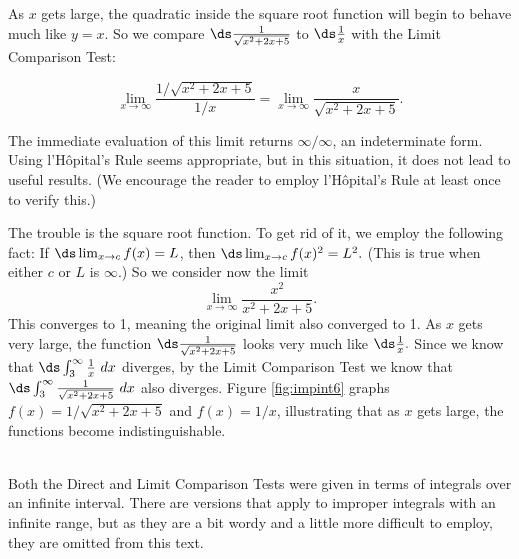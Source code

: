 {As $x$ gets large, the quadratic inside the square root function will begin to behave much like $y=x$. So we compare $\ds\frac{1}{\sqrt{x^2+2x+5}}$ to $\ds\frac1x$ with the Limit Comparison Test:

$$
\lim_{x\to\infty} \frac{1/\sqrt{x^2+2x+5}}{1/x} = \lim_{x\to\infty}\frac{x}{\sqrt{x^2+2x+5}}.$$

The immediate evaluation of this limit returns $\infty/\infty$, an indeterminate form. Using l'H\^opital's Rule seems appropriate, but in this situation, it does not lead to useful results. (We encourage the reader to employ l'H\^opital's Rule at least once to verify this.)

The trouble is the square root function. To get rid of it, we employ the following fact: If $\ds \lim_{x\to c} f(x) = L$, then $\ds\lim_{x\to c} f(x)^2 = L^2.$ (This is true when either $c$ or $L$ is $\infty$.) So we consider now the limit
$$\lim_{x\to\infty} \frac{x^2}{x^2+2x+5}.$$ This converges to 1, meaning the original limit also converged to 1. As $x$ gets very large, the function $\ds\frac{1}{\sqrt{x^2+2x+5}}$ looks very much like $\ds\frac1x.$ Since we know that $\ds\int_3^{\infty} \frac1x\ dx$ diverges, by the Limit Comparison Test we know that $\ds\int_3^\infty\frac{1}{\sqrt{x^2+2x+5}}\ dx$ also diverges. Figure \ref{fig:impint6} graphs $f(x)=1/\sqrt{x^2+2x+5}$ and $f(x)=1/x$, illustrating that as $x$ gets large, the functions become indistinguishable.
}\\

\enlargethispage{3\baselineskip}
Both the Direct and Limit Comparison Tests were given in terms of integrals over an infinite interval. There are versions that apply to improper integrals with an infinite range, but as they are a bit wordy and a little more difficult to employ, they are omitted from this text.


